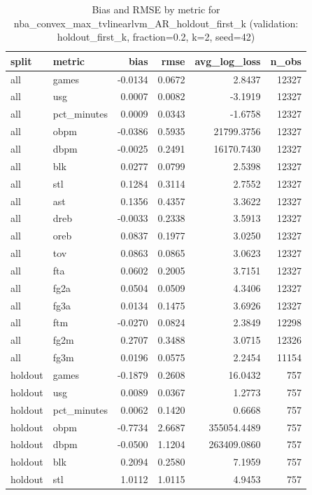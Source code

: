 \begin{table}
\caption{Bias and RMSE by metric for nba_convex_max_tvlinearlvm_AR_holdout_first_k (validation: holdout_first_k, fraction=0.2, k=2, seed=42)}
\label{tab:nba_convex_max_tvlinearlvm_AR_holdout_first_k_vs_holdout_first_k_f20_k2_s42_bias_rmse}
\begin{tabular}{llrrrr}
\toprule
split & metric & bias & rmse & avg\_log\_loss & n\_obs \\
\midrule
all & games & -0.0134 & 0.0672 & 2.8437 & 12327 \\
all & usg & 0.0007 & 0.0082 & -3.1919 & 12327 \\
all & pct\_minutes & 0.0009 & 0.0343 & -1.6758 & 12327 \\
all & obpm & -0.0386 & 0.5935 & 21799.3756 & 12327 \\
all & dbpm & -0.0025 & 0.2491 & 16170.7430 & 12327 \\
all & blk & 0.0277 & 0.0799 & 2.5398 & 12327 \\
all & stl & 0.1284 & 0.3114 & 2.7552 & 12327 \\
all & ast & 0.1356 & 0.4357 & 3.3622 & 12327 \\
all & dreb & -0.0033 & 0.2338 & 3.5913 & 12327 \\
all & oreb & 0.0837 & 0.1977 & 3.0250 & 12327 \\
all & tov & 0.0863 & 0.0865 & 3.0623 & 12327 \\
all & fta & 0.0602 & 0.2005 & 3.7151 & 12327 \\
all & fg2a & 0.0504 & 0.0509 & 4.3406 & 12327 \\
all & fg3a & 0.0134 & 0.1475 & 3.6926 & 12327 \\
all & ftm & -0.0270 & 0.0824 & 2.3849 & 12298 \\
all & fg2m & 0.2707 & 0.3488 & 3.0715 & 12326 \\
all & fg3m & 0.0196 & 0.0575 & 2.2454 & 11154 \\
holdout & games & -0.1879 & 0.2608 & 16.0432 & 757 \\
holdout & usg & 0.0089 & 0.0367 & 1.2773 & 757 \\
holdout & pct\_minutes & 0.0062 & 0.1420 & 0.6668 & 757 \\
holdout & obpm & -0.7734 & 2.6687 & 355054.4489 & 757 \\
holdout & dbpm & -0.0500 & 1.1204 & 263409.0860 & 757 \\
holdout & blk & 0.2094 & 0.2580 & 7.1959 & 757 \\
holdout & stl & 1.0112 & 1.0115 & 4.9453 & 757 \\

\end{tabular}
\end{table}

